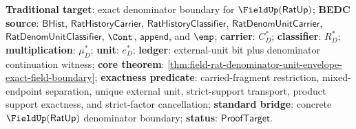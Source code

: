 \textbf{Traditional target}: exact denominator boundary for
$\FieldUp(\mathsf{RatUp})$; \textbf{BEDC source}: $\mathsf{BHist}$,
$\mathsf{RatHistoryCarrier}$, $\mathsf{RatHistoryClassifier}$,
$\mathsf{RatDenomUnitCarrier}$, $\mathsf{RatDenomUnitClassifier}$, $\Cont$,
$\mathsf{append}$, and $\emp$; \textbf{carrier}: $C_D^\ast$;
\textbf{classifier}: $R_D^\ast$; \textbf{multiplication}: $\mu_D^\ast$;
\textbf{unit}: $e_D^\ast$; \textbf{ledger}: external-unit bit plus denominator
continuation witness; \textbf{core theorem}:
\autoref{thm:field-rat-denominator-unit-envelope-exact-field-boundary};
\textbf{exactness predicate}: carried-fragment restriction, mixed-endpoint
separation, unique external unit, strict-support transport, product support
exactness, and strict-factor cancellation; \textbf{standard bridge}: concrete
$\FieldUp(\mathsf{RatUp})$ denominator boundary; \textbf{status}:
$\mathsf{ProofTarget}$.

